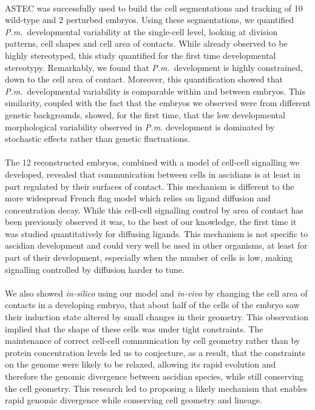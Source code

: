 \paragraph{}ASTEC was successfully used to build the cell segmentations and tracking of 10 wild-type and 2 perturbed embryos.
Using these segmentations, we quantified \textit{P.m.}\ developmental variability at the single-cell level, looking at division patterns, cell shapes and cell area of contacts.
While already observed to be highly stereotyped, this study quantified for the first time developmental stereotypy.
Remarkably, we found that \textit{P.m.}\ development is highly constrained, down to the cell area of contact.
Moreover, this quantification showed that \textit{P.m.}\ developmental variability is comparable within and between embryos.
This similarity, coupled with the fact that the embryos we observed were from different genetic backgrounds, showed, for the first time, that the low developmental morphological variability observed in \textit{P.m.} development is dominated by stochastic effects rather than genetic fluctuations.
\paragraph{}The 12 reconstructed embryos, combined with a model of cell-cell signalling we developed, revealed that communication between cells in ascidians is at least in part regulated by their surfaces of contact.
This mechanism is different to the more widespread French flag model which relies on ligand diffusion and concentration decay.
While this cell-cell signalling control by area of contact has been previously observed it was, to the best of our knowledge, the first time it was studied quantitatively for diffusing ligands.
This mechanism is not specific to ascidian development and could very well be used in other organisms, at least for part of their development, especially when the number of cells is low, making signalling controlled by diffusion harder to tune.
\paragraph{}We also showed \textit{in-silico} using our model and \textit{in-vivo} by changing the cell area of contacts in a developing embryo, that about half of the cells of the embryo saw their induction state altered by small changes in their geometry.
This observation implied that the shape of these cells was under tight constraints.
The maintenance of correct cell-cell communication by cell geometry rather than by protein concentration levels led us to conjecture, as a result, that the constraints on the genome were likely to be relaxed, allowing its rapid evolution and therefore the genomic divergence between ascidian species, while still conserving the cell geometry.
This research led to proposing a likely mechanism that enables rapid genomic divergence while conserving cell geometry and lineage.
